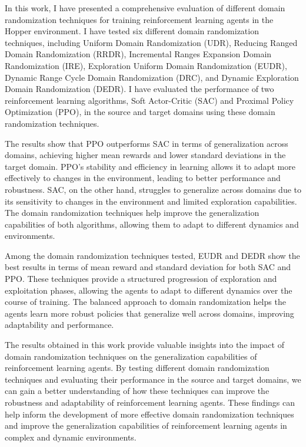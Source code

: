 \documentclass[12pt]{article}
\begin{document}
In this work, I have presented a comprehensive evaluation of different domain randomization techniques for training reinforcement learning agents in the Hopper environment. I have tested six different domain randomization techniques, including Uniform Domain Randomization (UDR), Reducing Ranged Domain Randomization (RRDR), Incremental Ranges Expansion Domain Randomization (IRE), Exploration Uniform Domain Randomization (EUDR), Dynamic Range Cycle Domain Randomization (DRC), and Dynamic Exploration Domain Randomization (DEDR). I have evaluated the performance of two reinforcement learning algorithms, Soft Actor-Critic (SAC) and Proximal Policy Optimization (PPO), in the source and target domains using these domain randomization techniques.

The results show that PPO outperforms SAC in terms of generalization across domains, achieving higher mean rewards and lower standard deviations in the target domain. PPO's stability and efficiency in learning allows it to adapt more effectively to changes in the environment, leading to better performance and robustness. SAC, on the other hand, struggles to generalize across domains due to its sensitivity to changes in the environment and limited exploration capabilities. The domain randomization techniques help improve the generalization capabilities of both algorithms, allowing them to adapt to different dynamics and environments.

Among the domain randomization techniques tested, EUDR and DEDR show the best results in terms of mean reward and standard deviation for both SAC and PPO. These techniques provide a structured progression of exploration and exploitation phases, allowing the agents to adapt to different dynamics over the course of training. The balanced approach to domain randomization helps the agents learn more robust policies that generalize well across domains, improving adaptability and performance.

The results obtained in this work provide valuable insights into the impact of domain randomization techniques on the generalization capabilities of reinforcement learning agents. By testing different domain randomization techniques and evaluating their performance in the source and target domains, we can gain a better understanding of how these techniques can improve the robustness and adaptability of reinforcement learning agents. These findings can help inform the development of more effective domain randomization techniques and improve the generalization capabilities of reinforcement learning agents in complex and dynamic environments.
\end{document}

